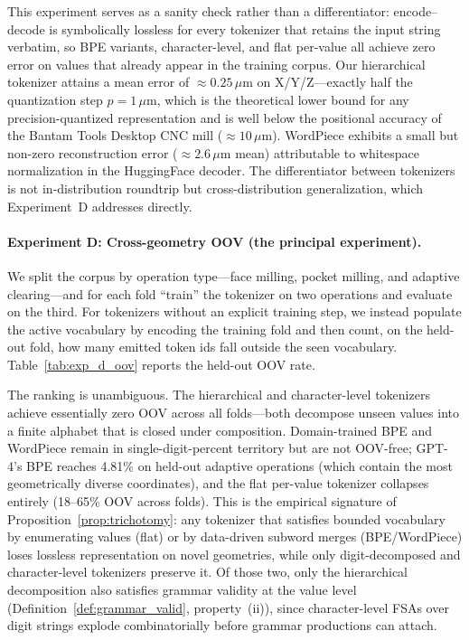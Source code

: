 \documentclass[11pt]{article}
\begin{document}
This experiment serves as a sanity check rather than a differentiator: encode--decode is symbolically lossless for every tokenizer that retains the input string verbatim, so BPE variants, character-level, and flat per-value all achieve zero error on values that already appear in the training corpus. Our hierarchical tokenizer attains a mean error of $\approx\!0.25\,\mu$m on X/Y/Z---exactly half the quantization step $p = 1\,\mu$m, which is the theoretical lower bound for any precision-quantized representation and is well below the positional accuracy of the Bantam Tools Desktop CNC mill ($\approx\!10\,\mu$m). WordPiece exhibits a small but non-zero reconstruction error ($\approx\!2.6\,\mu$m mean) attributable to whitespace normalization in the HuggingFace decoder. The differentiator between tokenizers is not in-distribution roundtrip but cross-distribution generalization, which Experiment~D addresses directly.

\paragraph{Experiment D: Cross-geometry OOV (the principal experiment).}
We split the corpus by operation type---face milling, pocket milling, and adaptive clearing---and for each fold ``train'' the tokenizer on two operations and evaluate on the third. For tokenizers without an explicit training step, we instead populate the active vocabulary by encoding the training fold and then count, on the held-out fold, how many emitted token ids fall outside the seen vocabulary. Table~\ref{tab:exp_d_oov} reports the held-out OOV rate.



The ranking is unambiguous. The hierarchical and character-level tokenizers achieve essentially zero OOV across all folds---both decompose unseen values into a finite alphabet that is closed under composition. Domain-trained BPE and WordPiece remain in single-digit-percent territory but are not OOV-free; GPT-4's BPE reaches 4.81\% on held-out adaptive operations (which contain the most geometrically diverse coordinates), and the flat per-value tokenizer collapses entirely (18--65\% OOV across folds). This is the empirical signature of Proposition~\ref{prop:trichotomy}: any tokenizer that satisfies bounded vocabulary by enumerating values (flat) or by data-driven subword merges (BPE/WordPiece) loses lossless representation on novel geometries, while only digit-decomposed and character-level tokenizers preserve it. Of those two, only the hierarchical decomposition also satisfies grammar validity at the value level (Definition~\ref{def:grammar_valid}, property~(ii)), since character-level FSAs over digit strings explode combinatorially before grammar productions can attach.
\end{document}
